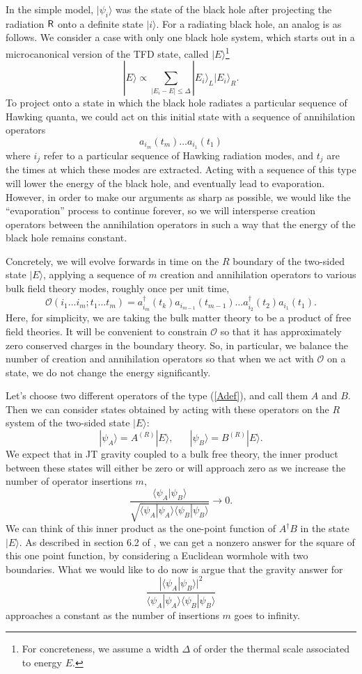 \documentclass[12pt]{article}
\newcommand{\be}{\begin{equation}}
\newcommand{\ee}{\end{equation}}
\numberwithin{equation}{section}
\begin{document}
In the simple model, $|\psi_i\rangle$ was the state of the black hole after projecting the radiation $\sf{R}$ onto a definite state $|i\rangle$. For a radiating black hole, an analog is as follows. We consider a case with only one black hole system, which starts out in a microcanonical version of the TFD state, called $|E\rangle$\footnote{For concreteness, we assume a width $\Delta$ of order the thermal scale associated to energy $E$.}
\be
|E\rangle \propto \sum_{|E_i-E|\le \Delta}|E_i\rangle_L|E_i\rangle_{R}.
\ee
To project onto a state in which the black hole radiates a particular sequence of Hawking quanta, we could act on this initial state with a sequence of annihilation operators
\be
a_{i_m}(t_m)\dots a_{i_1}(t_1)
\ee
where $i_j$ refer to a particular sequence of Hawking radiation modes, and $t_j$ are the times at which these modes are extracted. Acting with a sequence of this type will lower the energy of the black hole, and eventually lead to evaporation. However, in order to make our arguments as sharp as possible, we would like the ``evaporation'' process to continue forever, so we will intersperse creation operators between the annihilation operators in such a way that the energy of the black hole remains constant.

Concretely, we will evolve forwards in time on the $R$ boundary of the two-sided state $|E\rangle$, applying a sequence of $m$ creation and annihilation operators to various bulk field theory modes, roughly once per unit time,
\be
\mathcal{O}(i_1\dots i_m;t_1\dots t_m) = a_{i_m}^\dagger(t_k) a_{i_{m-1}}(t_{m-1}) \dots a_{i_2}^\dagger(t_2) a_{i_1}(t_1).\label{Adef}
\ee
Here, for simplicity, we are taking the bulk matter theory to be a product of free field theories. It will be convenient to constrain $\mathcal{O}$ so that it has approximately zero conserved charges in the boundary theory. So, in particular, we balance the number of creation and annihilation operators so that when we act with $\mathcal{O}$ on a state, we do not change the energy significantly.

Let's choose two different operators of the type (\ref{Adef}), and call them $A$ and $B$. Then we can consider states obtained by acting with these operators on the $R$ system of the two-sided state $|E\rangle$:
\be
|\psi_A\rangle = A^{(R)}|E\rangle, \hspace{20pt} |\psi_B\rangle = B^{(R)}|E\rangle.
\ee
We expect that in JT gravity coupled to a bulk free theory, the inner product between these states will either be zero or will approach zero as we increase the number of operator insertions $m$,
\be
\frac{\langle \psi_A|\psi_B\rangle}{\sqrt{\langle \psi_A|\psi_A\rangle\langle \psi_B|\psi_B\rangle}} \to 0.
\ee
We can think of this inner product as the one-point function of $A^\dagger B$ in the state $|E\rangle$. As described in section 6.2 of \cite{Saad:2019pqd}, we can get a nonzero answer for the square of this one point function, by considering a Euclidean wormhole with two boundaries. What we would like to do now is argue that the gravity answer for
\be
\frac{|\langle \psi_A|\psi_B\rangle|^2}{\langle \psi_A|\psi_A\rangle\langle \psi_B|\psi_B\rangle}\label{numdenom}
\ee
approaches a constant as the number of insertions $m$ goes to infinity.
\end{document}
